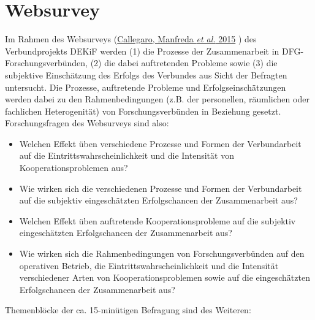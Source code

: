 \documentclass[a4paper,10pt,twoside]{article}
\providecommand{\tightlist}{%
  \setlength{\itemsep}{0pt}\setlength{\parskip}{0pt}}
\begin{document}
\hypertarget{websurvey}{%
\section{Websurvey}\label{websurvey}}

Im Rahmen des Websurveys (\protect\hyperlink{ref-callegaroWebSurveyMethodology2015}{Callegaro, Manfreda \emph{et al.} 2015} ) des Verbundprojekts DEKiF werden (1) die Prozesse der Zusammenarbeit in DFG-Forschungsverbünden, (2) die dabei auftretenden Probleme sowie (3) die subjektive Einschätzung des Erfolgs des Verbundes aus Sicht der Befragten untersucht. Die Prozesse, auftretende Probleme und Erfolgseinschätzungen werden dabei zu den Rahmenbedingungen (z.B. der personellen, räumlichen oder fachlichen Heterogenität) von Forschungsverbünden in Beziehung gesetzt. Forschungsfragen des Websurveys sind also:

\begin{itemize}
\tightlist
\item
  Welchen Effekt üben verschiedene Prozesse und Formen der Verbundarbeit auf die Eintrittswahrscheinlichkeit und die Intensität von Kooperationsproblemen aus?
\item
  Wie wirken sich die verschiedenen Prozesse und Formen der Verbundarbeit auf die subjektiv eingeschätzten Erfolgschancen der Zusammenarbeit aus?
\item
  Welchen Effekt üben auftretende Kooperationsprobleme auf die subjektiv eingeschätzten Erfolgschancen der Zusammenarbeit aus?
\item
  Wie wirken sich die Rahmenbedingungen von Forschungsverbünden auf den operativen Betrieb, die Eintrittswahrscheinlichkeit und die Intensität verschiedener Arten von Kooperationsproblemen sowie auf die eingeschätzten Erfolgschancen der Zusammenarbeit aus?
\end{itemize}

\vspace{3 mm}

Themenblöcke der ca. 15-minütigen Befragung sind des Weiteren:

\vspace{3 mm}

\end{document}

